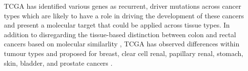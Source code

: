 \gls{TCGA} has identified various genes as recurrent, \glspl{driver mutation} across cancer types which are likely to have a role in driving the development of these cancers and present a molecular target that could be applied across tissue types.
In addition to disregarding the tissue-based distinction between colon and rectal cancers based on molecular similarlity \citep{TCGA2012CRC}, \gls{TCGA} has observed differences within tumour types and proposed  for breast, clear cell renal, papillary renal, stomach, skin, bladder, and prostate cancers \citep{TCGA2012, TCGA2012LUSC, TCGA2012CRC, TCGA2013RCC, TCGA2014BL, TCGA2014GC, TCGA2015LBC, TCGA2015SK, TCGA2016PRC, TCGA2015PR}.

